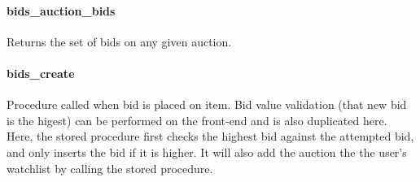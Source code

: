 \begin{Shaded}
\begin{Highlighting}[]
  \NormalTok{(}\NormalTok{))}
     \NormalTok{* }  
        
        
      
      \NormalTok{;}
\end{Highlighting}
\end{Shaded}

\paragraph{bids\_auction\_bids}\label{bidsux5fauctionux5fbids}

Returns the set of bids on any given auction.

\begin{Shaded}
\begin{Highlighting}[]
  \NormalTok{(}\NormalTok{))}
     \NormalTok{* }  
      \NormalTok{;}
\end{Highlighting}
\end{Shaded}

\paragraph{bids\_create}\label{bidsux5fcreate}

Procedure called when bid is placed on item. Bid value validation (that
new bid is the higest) can be performed on the front-end and is also
duplicated here. Here, the stored procedure first checks the highest bid
against the attempted bid, and only inserts the bid if it is higher. It
will also add the auction the the user's watchlist by calling the stored
procedure.

